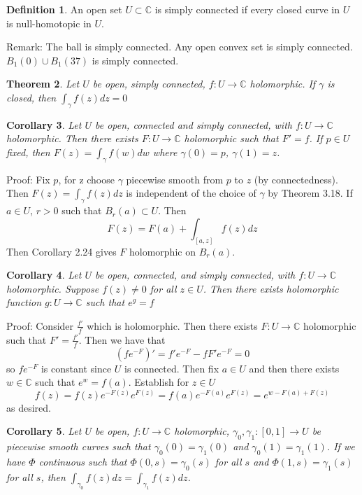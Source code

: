 \documentclass[11pt]{article}
\theoremstyle{plain}
\newtheorem{theorem}{Theorem}[section]
\newtheorem{corollary}[theorem]{Corollary}
\theoremstyle{definition}
\newtheorem{definition}[theorem]{Definition}
\newcommand{\C}{\mathbb{C}}
\begin{document}
\begin{definition}
An open set $U \subset \C$ is simply connected if every closed curve in $U$ is null-homotopic in $U$. 
\end{definition}

Remark: The ball is simply connected. Any open convex set is simply connected. $B_1(0) \cup B_1(37)$ is simply connected. 

\begin{theorem}
Let $U$ be open, simply connected, $f: U \to \C$ holomorphic. If $\gamma$ is closed, then $\int_{\gamma}f(z)dz = 0$
\end{theorem}

\begin{corollary}
Let $U$ be open, connected and simply connected, with $f: U \to \C$ holomorphic. Then there exists $F: U \to \C$ holomorphic such that $F' = f$. If $p \in U$ fixed, then $F(z) = \int_\gamma f(w)dw$ where $\gamma(0) = p$, $\gamma(1) = z$.
\end{corollary}

Proof: Fix $p$, for z choose $\gamma$ piecewise smooth from $p$ to $z$ (by connectedness). Then $F(z) = \int_{\gamma}f(z)dz$ is independent of the choice of $\gamma$ by Theorem 3.18. If $a \in U$, $r > 0$ such that $B_r(a) \subset U$. Then 
$$ F(z) = F(a) + \int_{[a,z]} f(z)dz $$
Then Corollary 2.24 gives $F$ holomorphic on $B_r(a)$. 

\begin{corollary}
Let $U$ be open, connected, and simply connected, with $f: U \to \C$ holomorphic. Suppose $f(z) \neq 0$ for all $z \in U$. Then there exists holomorphic function $g: U \to \C$ such that $e^g = f$
\end{corollary}

Proof: Consider $\frac{f'}{f}$ which is holomorphic. Then there exists $F: U \to \C$ holomorphic such that $F' = \frac{f'}{f}$. Then we have that 
$$ (fe^{-F})' = f'e^{-F} - fF'e^{-F} = 0 $$
so $fe^{-F}$ is constant since $U$ is connected. Then fix $a \in U$ and then there exists $w \in \C$ such that $e^w = f(a)$. Establish for $z \in U$ 
$$ f(z) = f(z)e^{-F(z)}e^{F(z)} = f(a)e^{-F(a)}e^{F(z)} = e^{w - F(a) + F(z)} $$
as desired.

\begin{corollary}
Let $U$ be open, $f: U \to \C$ holomorphic, $\gamma_0, \gamma_1:[0,1] \to U$ be piecewise smooth curves such that $\gamma_0(0) = \gamma_1(0)$ and $\gamma_0(1) = \gamma_1(1)$. If we have $\Phi$ continuous such that $\Phi(0, s) = \gamma_0(s)$ for all $s$ and $\Phi(1,s) = \gamma_1(s)$ for all $s$, then $\int_{\gamma_0} f(z)dz = \int_{\gamma_1} f(z)dz$.
\end{corollary}
\end{document}
